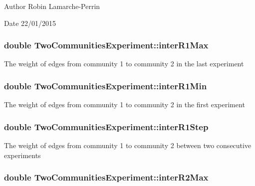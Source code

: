 \begin{DoxyAuthor}{Author}
Robin Lamarche-\/\-Perrin 
\end{DoxyAuthor}
\begin{DoxyDate}{Date}
22/01/2015 
\end{DoxyDate}
\hypertarget{class_two_communities_experiment_a1c0d181f60179b5457478a43e64638e0}{
\subsubsection[{inter\-R1\-Max}]{\setlength{\rightskip}{0pt plus 5cm}double Two\-Communities\-Experiment\-::inter\-R1\-Max}}\label{class_two_communities_experiment_a1c0d181f60179b5457478a43e64638e0}
The weight of edges from community 1 to community 2 in the last experiment \hypertarget{class_two_communities_experiment_aa8c411e9ac8be5c46cc32495917e9766}{
\subsubsection[{inter\-R1\-Min}]{\setlength{\rightskip}{0pt plus 5cm}double Two\-Communities\-Experiment\-::inter\-R1\-Min}}\label{class_two_communities_experiment_aa8c411e9ac8be5c46cc32495917e9766}
The weight of edges from community 1 to community 2 in the first experiment \hypertarget{class_two_communities_experiment_ac0977ad7c4e0c87534b60caebc34e8f0}{
\subsubsection[{inter\-R1\-Step}]{\setlength{\rightskip}{0pt plus 5cm}double Two\-Communities\-Experiment\-::inter\-R1\-Step}}\label{class_two_communities_experiment_ac0977ad7c4e0c87534b60caebc34e8f0}
The weight of edges from community 1 to community 2 between two consecutive experiments \hypertarget{class_two_communities_experiment_afc9e3538d0944d687ae23e6ad2e2a3fa}{
\subsubsection[{inter\-R2\-Max}]{\setlength{\rightskip}{0pt plus 5cm}double Two\-Communities\-Experiment\-::inter\-R2\-Max}}\label{class_two_communities_experiment_afc9e3538d0944d687ae23e6ad2e2a3fa}
